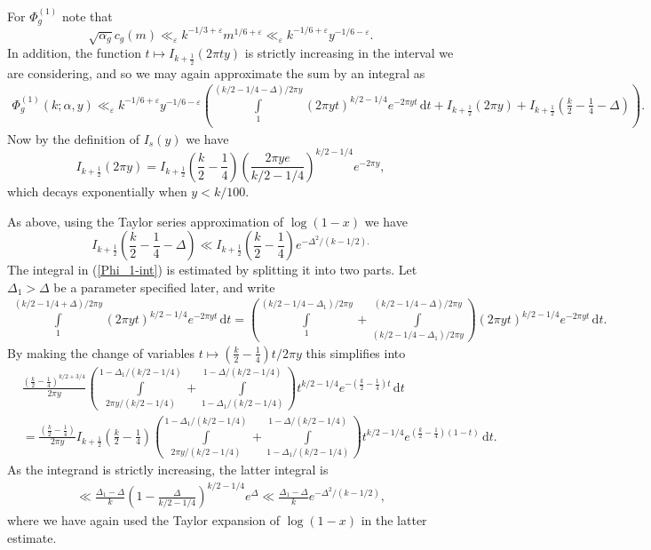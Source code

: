 \documentclass[a4paper,10pt,twoside]{amsart}
\theoremstyle{definition}
\numberwithin{equation}{section}
\newcommand\eps{\varepsilon}
\renewcommand\:{\colon}
\begin{document}
\noindent For $\Phi_g^{(1)}$ note that 
\[\sqrt{\alpha_g}c_g(m)\ll_\eps k^{-1/3+\varepsilon}m^{1/6+\varepsilon}\ll_\eps k^{- 1/6+\varepsilon}y^{-1/6-\eps}.\]
In addition, the function $t\mapsto I_{k+\frac12}(2\pi ty)$ is strictly increasing in the interval we are considering, and so we may again approximate the sum by an integral as
\begin{align}\label{Phi_1-int}
\Phi_g^{(1)}(k;\alpha,y)\ll_\eps k^{-1/6+\varepsilon}y^{-1/6-\eps}\left(\int\limits_1^{(k/2-1/4-\Delta)/2\pi y}(2\pi yt)^{k/2-1/4}e^{-2\pi yt}\,\mathrm d t+I_{k+\frac12}(2\pi y)+I_{k+\frac12}\left(\frac k2-\frac14-\Delta\right)\right).
\end{align}
Now  by the definition of $I_s(y)$ we have
\[ 
I_{k+\frac12}(2\pi y)=I_{k+\frac12}\left(\frac k2-\frac 14\right)\left(\frac{2\pi ye}{k/2-1/4}\right)^{k/2-1/4}e^{-2\pi y},\]
which decays exponentially when $y<k/100$.

As above, using the Taylor series approximation of $\log(1-x)$ we have 
\[I_{k+\frac12}\left(\frac k2-\frac14-\Delta\right)\ll I_{k+\frac12}\left(\frac k2-\frac 14\right)e^{-\Delta^2/(k-1/2).}\]
The integral in (\ref{Phi_1-int}) is estimated by splitting it into two parts. Let $\Delta_1>\Delta$ be a parameter specified later, and write
\begin{align*}
\int\limits_1^{(k/2-1/4+\Delta)/2\pi y}(2\pi yt)^{k/2-1/4}e^{-2\pi yt}\,\mathrm d t=\left(\int\limits_1^{(k/2-1/4-\Delta_1)/2\pi y}+\int\limits_{(k/2-1/4-\Delta_1)/2\pi y}^{(k/2-1/4-\Delta)/2\pi y}\right)(2\pi yt)^{k/2-1/4}e^{-2\pi yt}\,\mathrm d t.
\end{align*}
By making the change of variables $t\mapsto (\frac k2-\frac14)t/2\pi y$ this simplifies into 
\begin{align*}
&\frac{\left(\frac k2-\frac14\right)^{k/2+3/4}}{2\pi y}\left(\int\limits_{2\pi y/(k/2-1/4)}^{1-\Delta_1/(k/2-1/4)}+\int\limits_{1-\Delta_1/(k/2-1/4)}^{1-\Delta/(k/2-1/4)}\right) t^{k/2-1/4}e^{-\left(\frac k2-\frac14\right)t}\,\mathrm d t\\
&=\frac{\left(\frac k2-\frac14\right)}{2\pi y}I_{k+\frac12}\left(\frac k2-\frac14\right)\left(\int\limits_{2\pi y/(k/2-1/4)}^{1-\Delta_1/(k/2-1/4)}+\int\limits_{1-\Delta_1/(k/2-1/4)}^{1-\Delta/(k/2-1/4)}\right) t^{k/2-1/4}e^{\left(\frac k2-\frac14\right)(1-t)}\,\mathrm d t.
\end{align*}
As the integrand is strictly increasing, the latter integral is
\begin{align*}
\ll \frac{\Delta_1-\Delta}k\left(1-\frac\Delta{k/2-1/4}\right)^{k/2-1/4}e^\Delta\ll \frac{\Delta_1-\Delta}{k}e^{-\Delta^2/(k-1/2)},
\end{align*}
where we have again used the Taylor expansion of $\log(1-x)$ in the latter estimate.
\end{document}
